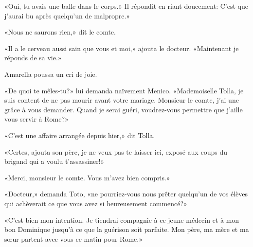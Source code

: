 «Oui, tu avais une balle dans le corps.» Il répondit en riant doucement:
C'est que j'aurai bu après quelqu'un de malpropre.»

«Nous ne saurons rien,» dit le comte.

«Il a le cerveau aussi sain que vous et moi,» ajouta le docteur.
«Maintenant je réponds de sa vie.»

Amarella poussa un cri de joie.

«De quoi te mêles-tu?» lui demanda naïvement Menico. «Mademoiselle
Tolla, je suis content de ne pas mourir avant votre mariage. Monsieur le
comte, j'ai une grâce à vous demander. Quand je serai guéri,
voudrez-vous permettre que j'aille vous servir à Rome?»

«C'est une affaire arrangée depuis hier,» dit Tolla.

«Certes, ajouta son père, je ne veux pas te laisser ici, exposé aux
coups du brigand qui a voulu t'assassiner!»

«Merci, monsieur le comte. Vous m'avez bien compris.»

«Docteur,» demanda Toto, «ne pourriez-vous nous prêter quelqu'un de vos
élèves qui achèverait ce que vous avez si heureusement commencé?»

«C'est bien mon intention. Je tiendrai compagnie à ce jeune médecin et à
mon bon Dominique jusqu'à ce que la guérison soit parfaite. Mon père, ma
mère et ma sœur partent avec vous ce matin pour Rome.»
